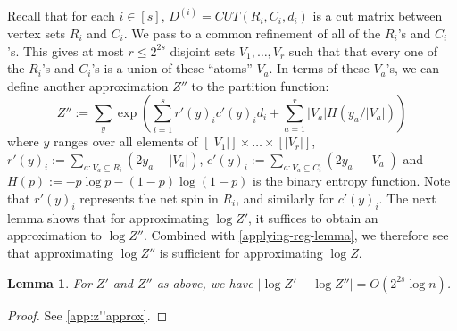 \documentclass[final, 12pt]{colt2018}
\newtheorem{lemma}[theorem]{Lemma}
\theoremstyle{definition}
\theoremstyle{plain}
\begin{document}
Recall that for each $i\in[s]$, $D^{(i)} = CUT(R_i,C_i,d_i)$ is a cut
matrix between vertex sets $R_i$ and $C_i$.
We pass to a common refinement of all of the $R_i$'s and $C_i$'s. This
gives at most $r \le 2^{2s}$ disjoint sets $V_1, \ldots, V_r$ such that
that every one of the $R_i$'s and $C_i$'s is a union of these ``atoms'' $V_a$. 
In terms of these $V_a$'s, we can define another approximation $Z''$ to the partition function: 
\[
Z'':=\sum_{y}\exp\left(\sum_{i=1}^{s}r'(y)_{i}c'(y)_{i}d_{i}+\sum_{a=1}^{r}|V_{a}|H(y_{a}/|V_{a}|)\right)
\]
where $y$ ranges over all elements of $[|V_{1}|]\times\dots\times[|V_{r}|]$,
$r'(y)_{i}:=\sum_{a\colon V_{a}\subseteq R_{i}}(2y_{a}-|V_{a}|)$,
$c'(y)_{i}:=\sum_{a\colon V_{a}\subseteq C_{i}}(2y_{a}-|V_{a}|)$
and $H(p):=-p\log p-(1-p)\log(1-p)$ is the binary entropy function. 
Note that $r'(y)_{i}$ represents the net spin in $R_{i}$, and similarly for $c'(y)_{i}$. The next lemma shows that for approximating $\log{Z'}$, it suffices to obtain an approximation to $\log{Z''}$. Combined with \cref{applying-reg-lemma}, we therefore see that approximating $\log{Z''}$ is sufficient for approximating $\log{Z}$.  

\begin{lemma}\label{z''-approx}
For $Z'$ and $Z''$ as above, we have $|\log Z' - \log Z''| = O(2^{2s} \log n)$.
\end{lemma}
\begin{proof}
See \cref{app:z''approx}. 
\begin{comment}
First, observe that $x^T D^{(i)} x = d_i \sum_{a \in R_i, b \in C_i} x_a x_b = d_i (\sum_{a \in R_i} x_a)(\sum_{b \in C_i} x_b)$. 
Thus, letting $r'_i(x) := \sum_{a \in R_i} x_a$ and $c'_i(x) := \sum_{b \in C_i} x_b$, we see that that
\[ Z' = \sum_x \exp(x^T(D^{(1)} + \cdots + D^{(s)}) x) = \sum_{x} \exp\left(\sum_i r'_i(x) c'_i(x) d_i\right). \]
Re-expressing the summation in terms of the possible values that $r'_i(x)$ and $c'_i(x)$ can take, we get that
\[ Z' = \sum_{r',c'} \exp\left(\sum_i r'_i c'_i d_i\right) \sum_{\substack{x \\ r'(x) = r' \\ c'(x) = c'}} 1. \]
where $r'$ ranges over all elements of $[|R_{1}|]\times\dots\times[|R_{s}|]$,
$r':=(r'_{1},\dots,r'_{s})$, $r'(x):=(r'_{1}(x),\dots,r'_{s}(x))$
and similarly for $c'$ and $c'(x)$. 
Next, since 
\[ \sum_{\substack{x \in \{\pm1\}^{n} \\ r'(x) = r'\\ c'(x) = c'}} 1 = \sum_{\substack{y \in [|V_{1}|]\times\dots\times[|V_{r}|]\\ r'(y) = r'\\ c'(y) = c'}} \prod_a {|V_a| \choose y_a} \]
it follows that  $Z' = \sum_{y} \exp\left(\sum_i r'(y)_i c'(y)_i d_i\right)  \prod_a {|V_a| \choose y_a}$. Finally, we apply Stirling's formula
\end{comment}
\end{proof}
\end{document}
